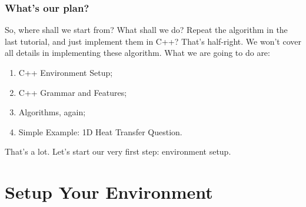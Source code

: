 \documentclass[compress,xcolor={dvipsnames}]{beamer}
\begin{document}
\begin{frame}
    \frametitle{What's our plan?}
    So, where shall we start from? What shall we do? Repeat the algorithm in the last tutorial, and just implement them in C++?
    \bigbreak
    \pause
    That's half-right. We won't cover all details in implementing these algorithm. What we are going to do are:
    \begin{enumerate}
        \item C++ Environment Setup;
        \item C++ Grammar and Features;
        \item Algorithms, again;
        \item Simple Example: 1D Heat Transfer Question.
    \end{enumerate}
    \pause
    That's a lot. Let's start our very first step: environment setup.
\end{frame}

\section{Setup Your Environment}
\end{document}
